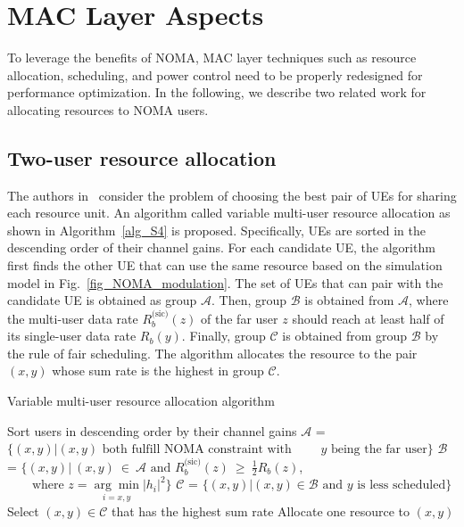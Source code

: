 \section{MAC Layer Aspects}
\label{sec_mac}

To leverage the benefits of NOMA, MAC layer techniques such as resource allocation, scheduling, and power control need to be
properly redesigned for performance optimization. In the following, we describe two related work for allocating resources to
NOMA users.

\subsection{Two-user resource allocation}
\label{sec_S4}

The authors in~\cite{cite_bell1} consider the problem of choosing the best pair of UEs for sharing each
resource unit. An algorithm called variable multi-user resource allocation as shown in Algorithm~\ref{alg_S4} is proposed.
Specifically, UEs are sorted in the descending order of their channel gains. For each candidate UE, the algorithm first finds the other
UE that can use the same resource based on the simulation model in Fig.~\ref{fig_NOMA_modulation}. The set of UEs that can pair with the candidate UE is obtained as group $\mathcal{A}$. Then, group  $\mathcal{B}$ is obtained from $\mathcal{A}$, where the multi-user data rate $R^{\text{(sic)}}_b(z)$ of the far user $z$ should reach at least half of its single-user data rate $R_b(y)$. Finally, group $\mathcal{C}$ is obtained from group $\mathcal{B}$ by the rule of fair scheduling. The algorithm allocates the resource to the pair $(x, y)$ whose sum rate is the highest in group $\mathcal{C}$.


\begin{algorithm}[t]
\caption{Variable multi-user resource allocation algorithm}
\label{alg_S4}
\begin{algorithmic}
\State Sort users in descending order by their channel gains
  \State $\mathcal{A}$ = $\{(x,y)| (x, y) \text{ both fulfill NOMA constraint with}$
  \State $\text{~~~~~~$y$ being the far user\}}$
  \State $\mathcal{B}$ = $\{(x,y)|~(x, y)~\in~\mathcal{A} \text{ and } R^{\text{(sic)}}_b(z)~\geq~\frac{1}{2}R_b(z)$,
  \State $\text{~~~~~~where } z=\underset{i=x,y}{\arg\min} |h_{i}|^2\}$
  \State $\mathcal{C}$ = $\{(x,y)| (x,y) \in \mathcal{B} \text{ and } y \text{ is less scheduled}\}$
  \State Select $(x, y) \in \mathcal{C}$ that has the highest sum rate
  \State Allocate one resource to $(x, y)$
\EndFor
\end{algorithmic}
\end{algorithm}


